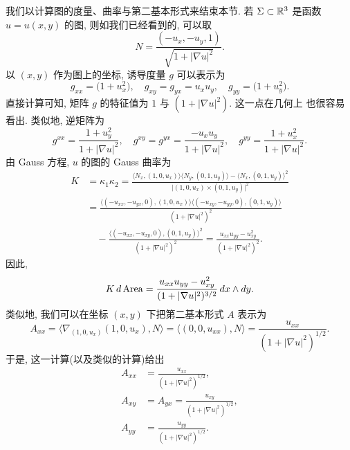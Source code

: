 我们以计算图的度量、曲率与第二基本形式来结束本节. 若 $\Sigma\subset\mathbb{R}^3$
是函数 $u=u(x,y)$ 的图, 则如我们已经看到的, 可以取
\begin{equation}
N=\frac{(-u_x,-u_y,1)}{\sqrt{1+|\nabla u|^2}}.
\label{eq:1.86}
\end{equation}
以 $(x,y)$ 作为图上的坐标, 诱导度量 $g$ 可以表示为
\begin{equation}
g_{xx}=\bigl(1+u_x^2\bigr),\quad
g_{xy}=g_{yx}=u_xu_y,\quad
g_{yy}=\bigl(1+u_y^2\bigr).
\label{eq:1.87}
\end{equation}
直接计算可知, 矩阵 $g$ 的特征值为 $1$ 与 $(1+|\nabla u|^2)$. 这一点在几何上
也很容易看出. 类似地, 逆矩阵为
\begin{equation}
g^{xx}=\frac{1+u_y^2}{1+|\nabla u|^2},\quad
g^{xy}=g^{yx}=\frac{-u_xu_y}{1+|\nabla u|^2},\quad
g^{yy}=\frac{1+u_x^2}{1+|\nabla u|^2}.
\label{eq:1.88}
\end{equation}
由 Gauss 方程, $u$ 的图的 Gauss 曲率为
\begin{equation}
\begin{aligned}
K&=\kappa_1\kappa_2
 =\frac{\langle N_x,(1,0,u_x)\rangle\langle N_y,(0,1,u_y)\rangle
  -\langle N_x,(0,1,u_y)\rangle^{2}}
 {\bigl|(1,0,u_x)\times(0,1,u_y)\bigr|^{2}}\\
&=\frac{\langle(-u_{xx},-u_{yx},0),(1,0,u_x)\rangle
  \langle(-u_{xy},-u_{yy},0),(0,1,u_y)\rangle}
 {(1+|\nabla u|^2)^{2}}\\
&\quad-\frac{\langle(-u_{xx},-u_{xy},0),(0,1,u_y)\rangle^{2}}
 {(1+|\nabla u|^2)^{2}}
 =\frac{u_{xx}u_{yy}-u_{xy}^2}{(1+|\nabla u|^2)^{2}}.
\end{aligned}
\label{eq:1.89}
\end{equation}
因此,
\begin{equation}
K\,d\operatorname{Area}
 =\frac{u_{xx}u_{yy}-u_{xy}^2}{(1+|\nabla u|^2)^{3/2}}\,dx\wedge dy.
\label{eq:1.90}
\end{equation}
类似地, 我们可以在坐标 $(x,y)$ 下把第二基本形式 $A$ 表示为
\begin{equation}
A_{xx}=\bigl\langle\nabla_{(1,0,u_x)}(1,0,u_x),N\bigr\rangle
 =\bigl\langle(0,0,u_{xx}),N\bigr\rangle
 =\frac{u_{xx}}{(1+|\nabla u|^2)^{1/2}}.
\label{eq:1.91}
\end{equation}
于是, 这一计算(以及类似的计算)给出
\begin{equation}
\begin{aligned}
A_{xx}&=\frac{u_{xx}}{(1+|\nabla u|^2)^{1/2}},\\
A_{xy}&=A_{yx}=\frac{u_{xy}}{(1+|\nabla u|^2)^{1/2}},\\
A_{yy}&=\frac{u_{yy}}{(1+|\nabla u|^2)^{1/2}}.
\end{aligned}
\label{eq:1.92}
\end{equation}

